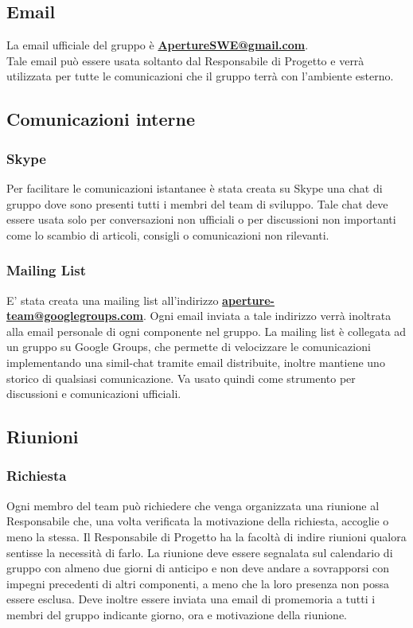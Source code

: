 \subsection{Email}
\label{3.1}
La email ufficiale del gruppo è \textbf{\url{ApertureSWE@gmail.com}}.\\
Tale email può essere usata soltanto dal Responsabile di Progetto e verrà utilizzata per tutte le comunicazioni che il gruppo terrà con l'ambiente esterno.

\subsection{Comunicazioni interne}
\label{3.2}

\subsubsection{Skype}
\label{3.2.1}
Per facilitare le comunicazioni istantanee è stata creata su Skype una chat di gruppo dove sono presenti tutti i membri del team di sviluppo. Tale chat deve essere usata solo per conversazioni non ufficiali o per discussioni non importanti come lo scambio di articoli, consigli o comunicazioni non rilevanti.

\subsubsection{Mailing List}
\label{3.2.2}
E' stata creata una mailing list all'indirizzo \textbf{\url{aperture-team@googlegroups.com}}.
Ogni email inviata a tale indirizzo verrà inoltrata alla email personale di ogni componente nel gruppo.
La mailing list è collegata ad un gruppo su Google Groups, che permette di velocizzare le comunicazioni implementando una simil-chat tramite email distribuite, inoltre mantiene uno storico di qualsiasi comunicazione. Va usato quindi come strumento per discussioni e comunicazioni ufficiali.

\subsection{Riunioni}
\label{3.3}

\subsubsection{Richiesta}
\label{3.3.1}
Ogni membro del team può richiedere che venga organizzata una riunione al Responsabile che, una volta verificata la motivazione della richiesta, accoglie o meno la stessa.
Il Responsabile di Progetto ha la facoltà di indire riunioni qualora sentisse la necessità di farlo.
La riunione deve essere segnalata sul calendario di gruppo con almeno due giorni di anticipo e non deve andare a sovrapporsi con impegni precedenti di altri componenti, a meno che la loro presenza non possa essere esclusa. Deve inoltre essere inviata una email di promemoria a tutti i membri del gruppo indicante giorno, ora e motivazione della riunione.

